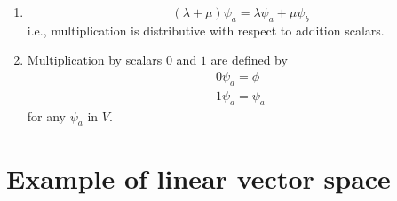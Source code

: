 \begin{enumerate}
\begin{enumerate}
		\item 
		\begin{equation}\label{eqn:2.7}
		(\lambda + \mu) \psi_a = \lambda \psi_a + \mu \psi_b
		\end{equation}
		i.e., multiplication is distributive with respect to addition scalars.
		
		\item 
		Multiplication by scalars $0$ and $1$ are defined by
		\begin{eqnarray}\label{eqn:2.8-2.9}
			0 \psi_a = \phi \\
			1 \psi_a = \psi_a
		\end{eqnarray}
		for any $\psi_a$ in $V$.
	\end{enumerate}
\end{enumerate}
\section{Example of linear vector space}
